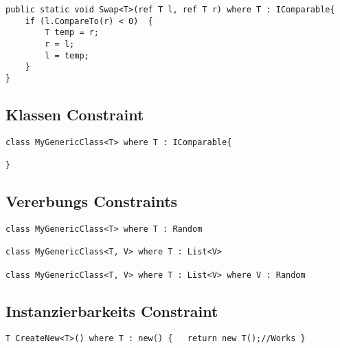 \begin{lstlisting}[language={[Sharp]C}]
public static void Swap<T>(ref T l, ref T r) where T : IComparable{
	if (l.CompareTo(r) < 0)  {
		T temp = r;
		r = l;
		l = temp;
	}
}
\end{lstlisting}

\subsection{Klassen Constraint}
\begin{lstlisting}[language={[Sharp]C}]
class MyGenericClass<T> where T : IComparable{

}
\end{lstlisting}
\subsection{Vererbungs Constraints}

\begin{lstlisting}[language={[Sharp]C}]
class MyGenericClass<T> where T : Random

class MyGenericClass<T, V> where T : List<V>

class MyGenericClass<T, V> where T : List<V> where V : Random
\end{lstlisting}

\subsection{Instanzierbarkeits Constraint}
\begin{lstlisting}[language={[Sharp]C}]
T CreateNew<T>() where T : new() {   return new T();//Works }
\end{lstlisting}